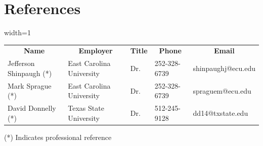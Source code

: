 
\setlength{\tabcolsep}{\oldtabcolsep} %
\section{References}
\begin{table}[htb!]
\centering
\begin{adjustbox}{width=1\textwidth} %
\begin{tabular}{lllll}
\multicolumn{1}{c}{\textbf{Name}} & \multicolumn{1}{c}{\textbf{Employer}} & \multicolumn{1}{c}{\textbf{Title}} & \multicolumn{1}{c}{\textbf{Phone}} & \multicolumn{1}{c}{\textbf{Email}} \\
Jefferson Shinpaugh (*) & East Carolina University & Dr. & 252-328-6739 & shinpaughj@ecu.edu \\ %
Mark Sprague (*) & East Carolina University & Dr. & 252-328-6739 & spraguem@ecu.edu \\ %
David Donnelly (*) & Texas State University & Dr. & 512-245-9128 & dd14@txstate.edu \\ %
\end{tabular}
\end{adjustbox}
\end{table}
(*) Indicates professional reference
\setlength{\tabcolsep}{0pt} %